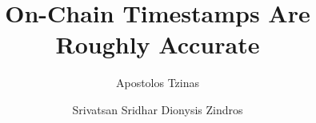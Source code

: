 \title{On-Chain Timestamps Are Roughly Accurate}
\ifanonymous{
  \author{}\institute{}
}
\else
\author{
        Apostolos Tzinas \and
        Srivatsan Sridhar 
        Dionysis Zindros \and
}
\fi
